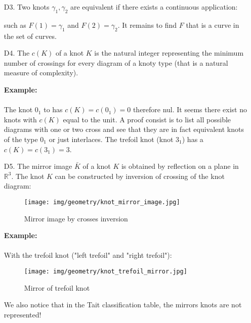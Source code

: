 {\begin{enumerate}
		\item[D3.] Two knots $\gamma_1, \gamma_2$ are equivalent if there exists a continuous application:
		
		such as $F(1)=\gamma_1$ and $F(2)=\gamma_2$. It remains to find $F$ that is a curve in the set of curves.
		
		\item[D4.] The $c(K)$ of a knot $K$ is the natural integer representing the minimum number of crossings for every diagram of a knoty type (that is a natural measure of complexity).
		
		\begin{tcolorbox}[colframe=black,colback=white,sharp corners]
		\textbf{{\Large {}}Example:}\\\\
		The knot $0_1$ to has $c(K)=c(0_1)=0$ therefore nul. It seems there exist no knots with $c(K)$ equal to the unit. A proof consist is to list all possible diagrams with one or two cross and see that they are in fact equivalent knots of the type $0_1$ or just interlaces. The trefoil knot (knot $3_1$) has a $c(K)=c(3_1)=3$.
		\end{tcolorbox}
		
		\item[D5.] The mirror image $\bar{K}$ of a knot $K$ is obtained by reflection on a plane in $\mathbb{R}^3$. The knot $K$ can be constructed by inversion of crossing of the knot diagram:
		\begin{figure}[H]
			\centering
			\texttt{[image: img/geometry/knot\_mirror\_image.jpg]}
			\caption{Mirror image by crosses inversion}
		\end{figure}
		
		\begin{tcolorbox}[colframe=black,colback=white,sharp corners]
		\textbf{{\Large {}}Example:}\\\\
		With the trefoil knot ("left trefoil" and "right trefoil"):
		\begin{figure}[H]
			\centering
			\texttt{[image: img/geometry/knot\_trefoil\_mirror.jpg]}
			\caption{Mirror of trefoil knot}
		\end{figure}
		\end{tcolorbox}
		
		\begin{tcolorbox}[title=Remark,colframe=black,arc=10pt]
		We also notice that in the Tait classification table, the mirrors knots are not represented!
		\end{tcolorbox}
		

\end{enumerate}}
